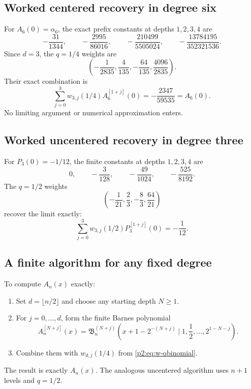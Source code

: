 \documentclass[11pt,oneside]{article}
\numberwithin{equation}{section}
\theoremstyle{definition}
\theoremstyle{remark}
\begin{document}
\subsection{Worked centered recovery in degree six}

For $A_6(0)=\alpha_6$, the exact prefix constants at depths $1,2,3,4$ are
\begin{equation}
 -\frac{31}{1344},
 \qquad
 -\frac{2995}{86016},
 \qquad
 -\frac{210499}{5505024},
 \qquad
 -\frac{13784195}{352321536}.
 \label{p2:eq:A6-prefix-values}
\end{equation}
Since $d=3$, the $q=1/4$ weights are
\begin{equation}
 \left(
 -\frac1{2835},\frac4{135},-\frac{64}{135},\frac{4096}{2835}
 \right).
 \label{p2:eq:q14-weights3}
\end{equation}
Their exact combination is
\begin{equation}
 \sum_{j=0}^{3}w_{3,j}(1/4)A_6^{[1+j]}(0)
 =-\frac{2347}{59535}=A_6(0).
 \label{p2:eq:A6-exact-example}
\end{equation}
No limiting argument or numerical approximation enters.

\subsection{Worked uncentered recovery in degree three}

For $P_3(0)=-1/12$, the finite constants at depths $1,2,3,4$ are
\begin{equation}
 0,
 \qquad -\frac3{128},
 \qquad -\frac{49}{1024},
 \qquad -\frac{525}{8192}.
 \label{p2:eq:P3-prefix-values}
\end{equation}
The $q=1/2$ weights
\begin{equation}
 \left(-\frac1{21},\frac23,-\frac83,\frac{64}{21}\right)
 \label{p2:eq:q12-weights3}
\end{equation}
recover the limit exactly:
\begin{equation}
 \sum_{j=0}^{3}w_{3,j}(1/2)P_3^{[1+j]}(0)=-\frac1{12}.
 \label{p2:eq:P3-exact-example}
\end{equation}

\subsection{A finite algorithm for any fixed degree}

\begin{algorithm}
\label{p2:alg:exact-Appell}
To compute $A_n(x)$ exactly:
\begin{enumerate}
\item Set $d=\lfloor n/2\rfloor$ and choose any starting depth $N\ge1$.
\item For $j=0,\ldots,d$, form the finite Barnes polynomial
\[
 A_n^{[N+j]}(x)
 =\mathfrak B_n^{(N+j)}
 \left(x+1-2^{-(N+j)}\mid1,\frac12,\ldots,2^{1-N-j}\right).
\]
\item Combine them with $w_{d,j}(1/4)$ from \eqref{p2:eq:w-qbinomial}.
\end{enumerate}
The result is exactly $A_n(x)$.  The analogous uncentered algorithm uses $n+1$ levels and
$q=1/2$.
\end{algorithm}
\end{document}

